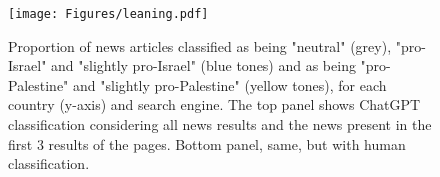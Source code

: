 
\begin{figure}[t]
    \centering
    \texttt{[image: Figures/leaning.pdf]}
    \caption{Proportion of news articles classified as being "neutral" (grey), "pro-Israel" and "slightly pro-Israel" (blue tones) and as being "pro-Palestine" and "slightly pro-Palestine" (yellow tones), for each country (y-axis) and search engine. The top panel shows ChatGPT classification considering all news results and the news present in the first 3 results of the pages. Bottom panel, 
    same, but with human classification.}
    \label{leaning}
    \Description{}
\end{figure}

